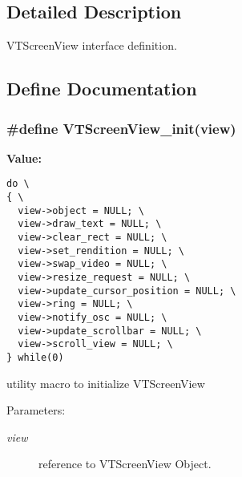 \subsection{Detailed Description}
VTScreen\-View interface definition.



\subsection{Define Documentation}
\subsubsection{\setlength{\rightskip}{0pt plus 5cm}\#define VTScreen\-View\_\-init(view)}\label{screen_8h_a3}


{\bf Value:}

\footnotesize\begin{verbatim}do \
{ \
  view->object = NULL; \
  view->draw_text = NULL; \
  view->clear_rect = NULL; \
  view->set_rendition = NULL; \
  view->swap_video = NULL; \
  view->resize_request = NULL; \
  view->update_cursor_position = NULL; \
  view->ring = NULL; \
  view->notify_osc = NULL; \
  view->update_scrollbar = NULL; \
  view->scroll_view = NULL; \
} while(0)
\end{verbatim}\normalsize 
utility macro to initialize VTScreen\-View

\begin{Desc}
\item[Parameters:]
\begin{description}
\item[{\em view}]reference to VTScreen\-View Object. \end{description}
\end{Desc}
